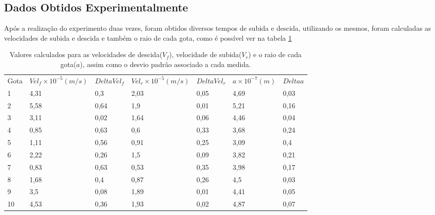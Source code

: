 \subsection{Dados Obtidos Experimentalmente}
Após a realização do experimento duas vezes, foram obtidos diversos tempos de subida e descida, utilizando os mesmos, foram calculadas as velocidades de subida e descida e também o raio de cada gota, como é possível ver na tabela \ref{tab:Vel}
\begin{table}[!htb]
\centering
\begin{tabular}{l|ll|ll|ll|}

Gota & $Vel_f \times 10^{-5} (m/s)$ & $Delta Vel_f$ & $Vel_r \times 10^{-5} (m/s)$ & $Delta Vel_r$ & $a \times 10^{-7} (m)$ & $Delta a$ \\
\rowcolor[HTML]{C0C0C0} 
1    & 4,31                         & 0,3           & 2,03                         & 0,05          & 4,69                   & 0,03      \\ 
2    & 5,58                         & 0,64          & 1,9                          & 0,01          & 5,21                   & 0,16      \\
\rowcolor[HTML]{C0C0C0} 
3    & 3,11                         & 0,02          & 1,64                         & 0,06          & 4,46                   & 0,04      \\
4    & 0,85                         & 0,63          & 0,6                          & 0,33          & 3,68                   & 0,24      \\
\rowcolor[HTML]{C0C0C0} 
5    & 1,11                         & 0,56          & 0,91                         & 0,25          & 3,09                   & 0,4       \\
6    & 2,22                         & 0,26          & 1,5                          & 0,09          & 3,82                   & 0,21      \\
\rowcolor[HTML]{C0C0C0} 
7    & 0,83                         & 0,63          & 0,53                         & 0,35          & 3,98                   & 0,17      \\
8    & 1,68                         & 0,4           & 0,87                         & 0,26          & 4,5                    & 0,03      \\
\rowcolor[HTML]{C0C0C0} 
9   & 3,5                          & 0,08          & 1,89                         & 0,01          & 4,41                   & 0,05      \\
10   & 4,53                         & 0,36          & 1,93                         & 0,02          & 4,87                   & 0,07      \\ \hline
\end{tabular}
\caption{Valores calculados para as velocidades de descida($V_f$), velocidade de subida($V_r$) e o raio de cada gota($a$), assim como o desvio padrão associado a cada medida.}
\label{tab:Vel}
\end{table}

